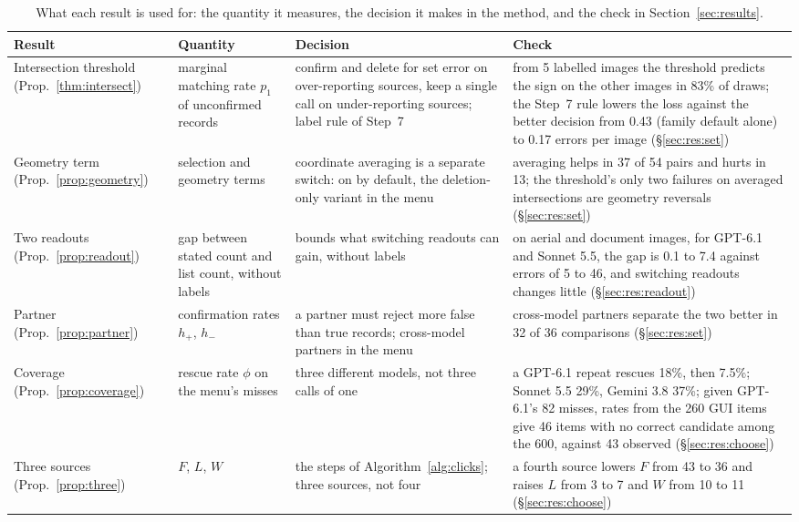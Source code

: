 \begin{table}[t]
\centering\footnotesize\setlength{\tabcolsep}{3.5pt}
\caption{What each result is used for: the quantity it measures, the decision it makes in the method, and the check in Section~\ref{sec:results}.}\label{tab:theory_use}
\begin{tabular}{@{}>{\raggedright\arraybackslash}p{2.6cm}>{\raggedright\arraybackslash}p{3.2cm}>{\raggedright\arraybackslash}p{4.5cm}>{\raggedright\arraybackslash}p{4.9cm}@{}}\toprule
Result & Quantity & Decision & Check \\\midrule
Intersection threshold (Prop.~\ref{thm:intersect}) & marginal matching rate $p_1$ of unconfirmed records & confirm and delete for set error on over-reporting sources, keep a single call on under-reporting sources; label rule of Step~7 & from 5 labelled images the threshold predicts the sign on the other images in 83\% of draws; the Step~7 rule lowers the loss against the better decision from 0.43 (family default alone) to 0.17 errors per image (\S\ref{sec:res:set}) \\
Geometry term (Prop.~\ref{prop:geometry}) & selection and geometry terms & coordinate averaging is a separate switch: on by default, the deletion-only variant in the menu & averaging helps in 37 of 54 pairs and hurts in 13; the threshold's only two failures on averaged intersections are geometry reversals (\S\ref{sec:res:set}) \\
Two readouts (Prop.~\ref{prop:readout}) & gap between stated count and list count, without labels & bounds what switching readouts can gain, without labels & on aerial and document images, for GPT-6.1 and Sonnet 5.5, the gap is 0.1 to 7.4 against errors of 5 to 46, and switching readouts changes little (\S\ref{sec:res:readout}) \\
Partner (Prop.~\ref{prop:partner}) & confirmation rates $h_+$, $h_-$ & a partner must reject more false than true records; cross-model partners in the menu & cross-model partners separate the two better in 32 of 36 comparisons (\S\ref{sec:res:set}) \\
Coverage (Prop.~\ref{prop:coverage}) & rescue rate $\phi$ on the menu's misses & three different models, not three calls of one & a GPT-6.1 repeat rescues 18\%, then 7.5\%; Sonnet 5.5 29\%, Gemini 3.8 37\%; given GPT-6.1's 82 misses, rates from the 260 GUI items give 46 items with no correct candidate among the 600, against 43 observed (\S\ref{sec:res:choose}) \\
Three sources (Prop.~\ref{prop:three}) & $F$, $L$, $W$ & the steps of Algorithm~\ref{alg:clicks}; three sources, not four & a fourth source lowers $F$ from 43 to 36 and raises $L$ from 3 to 7 and $W$ from 10 to 11 (\S\ref{sec:res:choose}) \\

\end{tabular}
\end{table}
